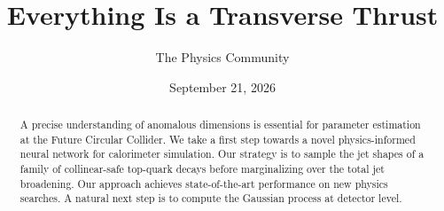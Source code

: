 \documentclass[11pt]{article}
\title{Everything Is a Transverse Thrust}
\author{The Physics Community}
\date{September 21, 2026}
\numberwithin{equation}{section}
\theoremstyle{definition}
\theoremstyle{remark}
\begin{document}
\maketitle
\begin{abstract}
A precise understanding of anomalous dimensions is essential for
parameter estimation at the Future Circular Collider. We take a first
step towards a novel physics-informed neural network for calorimeter
simulation. Our strategy is to sample the jet shapes of a family of
collinear-safe top-quark decays before marginalizing over the total jet
broadening. Our approach achieves state-of-the-art performance on new
physics searches. A natural next step is to compute the Gaussian process
at detector level.
\end{abstract}
\tableofcontents




\nocite{*}


\end{document}
